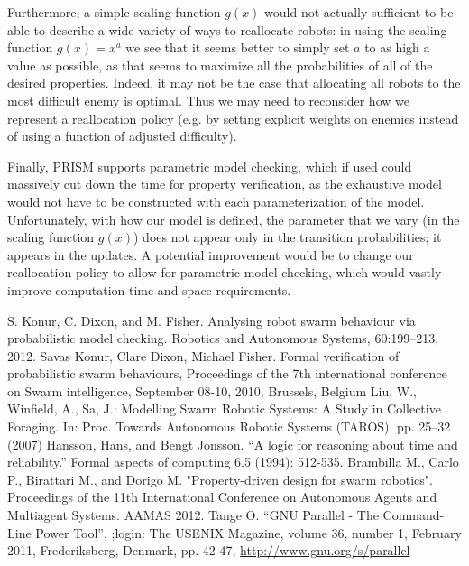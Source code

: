 \documentclass[11pt]{article}
\theoremstyle{definition}
\begin{document}
Furthermore, a simple scaling function $ g(x) $
would not actually sufficient to be able to
describe a wide variety of ways to reallocate
robots: in using the scaling function $ g(x) = x^a $
we see that it seems better to simply set
$ a $ to as high a value as possible, as that
seems to maximize all the probabilities of all
of the desired properties. Indeed, it may not be the
case that allocating all robots to the most
difficult enemy is optimal. Thus we may need
to reconsider how we represent a reallocation policy
(e.g. by setting explicit weights on enemies
instead of using a function of adjusted difficulty).

Finally, PRISM supports parametric model checking,
which if used could massively cut down the
time for property verification, as the exhaustive
model would not have to be constructed with
each parameterization of the model. Unfortunately,
with how our model is defined, the parameter
that we vary (in the scaling function $ g(x) $)
does not appear only in the transition probabilities;
it appears in the updates. A potential improvement
would be to change our reallocation policy to
allow for parametric model checking, which
would vastly improve computation time and
space requirements.

\pagebreak

\begin{thebibliography}{99}
        S. Konur, C. Dixon, and M. Fisher.
        Analysing robot swarm behaviour via probabilistic model checking.
        Robotics and Autonomous Systems, 60:199–213,
        2012.
        Savas Konur, Clare Dixon, Michael Fisher.
        Formal verification of probabilistic swarm behaviours,
        Proceedings of the 7th international conference on Swarm intelligence,
        September 08-10, 2010, Brussels, Belgium
        Liu, W., Winfield, A., Sa, J.:
        Modelling Swarm Robotic Systems: A Study in Collective Foraging.
        In: Proc. Towards Autonomous Robotic Systems (TAROS).
        pp. 25–32 (2007)
        Hansson, Hans, and Bengt Jonsson.
        ``A logic for reasoning about time and reliability.''
        Formal aspects of computing 6.5 (1994): 512-535.
        Brambilla M., Carlo P., Birattari M., and Dorigo M.
        "Property-driven design for swarm robotics".
        Proceedings of the 11th International Conference on
        Autonomous Agents and Multiagent Systems.
        AAMAS 2012.
        Tange O.
        ``GNU Parallel - The Command-Line Power Tool'',
        ;login: The USENIX Magazine,
        volume 36, number 1, February 2011,
        Frederiksberg, Denmark,
        pp. 42-47,
        \url{http://www.gnu.org/s/parallel}
\end{thebibliography}
\end{document}
